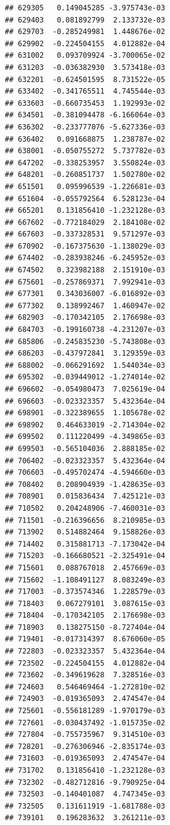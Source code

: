 \documentclass[ignorenonframetext,]{beamer}
\begin{document}
\begin{frame}[fragile]
\begin{verbatim}
## 629305   0.149045285 -3.975743e-03
## 629403   0.081892799  2.133732e-03
## 629703  -0.285249981  1.448676e-02
## 629902  -0.224504155  4.012882e-04
## 631002   0.093709924 -3.700065e-02
## 631203  -0.036382930  3.573418e-03
## 632201  -0.624501595  8.731522e-05
## 633402  -0.341765511  4.745544e-03
## 633603  -0.660735453  1.192993e-02
## 634501  -0.381094478 -6.166064e-03
## 636302  -0.233777076 -5.627336e-03
## 636402   0.091668875  1.238787e-02
## 638001  -0.050755272  5.737782e-03
## 647202  -0.338253957  3.550824e-03
## 648201  -0.260851737  1.502780e-02
## 651501   0.095996539 -1.226681e-03
## 651604  -0.055792564  6.528123e-04
## 665201   0.131856410 -1.232128e-03
## 667602  -0.772184029  2.184108e-02
## 667603  -0.337328531  9.571297e-03
## 670902  -0.167375630 -1.138029e-03
## 674402  -0.283938246 -6.245952e-03
## 674502   0.323982188  2.151910e-03
## 675601  -0.257869371  7.992941e-03
## 677301   0.343036007 -6.016892e-03
## 677302   0.138992467  1.460947e-02
## 682903  -0.170342105  2.176698e-03
## 684703  -0.199160738 -4.231207e-03
## 685806  -0.245835230 -5.743808e-03
## 686203  -0.437972841  3.129359e-03
## 688002  -0.066291692  1.544034e-03
## 695302  -0.039449012 -1.274014e-02
## 696602  -0.054980473  7.025619e-04
## 696603  -0.023323357  5.432364e-04
## 698901  -0.322389655  1.105678e-02
## 698902   0.464633019 -2.714304e-02
## 699502   0.111220499 -4.349865e-03
## 699503  -0.565104036  2.888185e-02
## 706402  -0.023323357  5.432364e-04
## 706603  -0.495702474 -4.594660e-03
## 708402   0.208904939 -1.428635e-03
## 708901   0.015836434  7.425121e-03
## 710502   0.204248906 -7.460031e-03
## 711501  -0.216396656  8.210985e-03
## 713902   0.514882464  9.158826e-03
## 714402   0.315881713 -7.173042e-04
## 715203  -0.166680521 -2.325491e-04
## 715601   0.088767018  2.457669e-03
## 715602  -1.108491127  8.083249e-03
## 717003  -0.373574346  1.228579e-03
## 718403   0.067279101  3.087615e-03
## 718404  -0.170342105  2.176698e-03
## 718903   0.138275150 -8.727404e-04
## 719401  -0.017314397  8.676060e-05
## 722803  -0.023323357  5.432364e-04
## 723502  -0.224504155  4.012882e-04
## 723602  -0.349619628  7.328516e-03
## 724603   0.546469464 -1.272810e-02
## 724903  -0.019365093  2.474547e-04
## 725601  -0.556181289 -1.970179e-03
## 727601  -0.030437492 -1.015735e-02
## 727804  -0.755735967  9.314510e-03
## 728201  -0.276306946 -2.835174e-03
## 731603  -0.019365093  2.474547e-04
## 731702   0.131856410 -1.232128e-03
## 732302  -0.482712816 -9.790925e-04
## 732503  -0.140401087  4.747345e-03
## 732505   0.131611919 -1.681788e-03
## 739101   0.196283632  3.261211e-03

\end{verbatim}
\end{frame}
\end{document}
